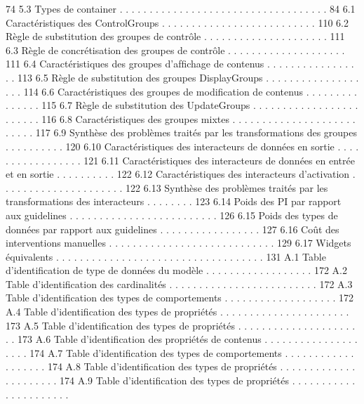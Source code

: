 \documentclass{article}
\begin{document}
74
5.3
Types de container
. . . . . . . . . . . . . . . . . . . . . . . . . . . . . . . . . . .
84
6.1
Caractéristiques des ControlGroups
. . . . . . . . . . . . . . . . . . . . . . . . . .
110
6.2
Règle de substitution des groupes de contrôle
. . . . . . . . . . . . . . . . . . . . .
111
6.3
Règle de concrétisation des groupes de contrôle . . . . . . . . . . . . . . . . . . . .
111
6.4
Caractéristiques des groupes d’afﬁchage de contenus
. . . . . . . . . . . . . . . . .
113
6.5
Règle de substitution des groupes DisplayGroups . . . . . . . . . . . . . . . . . . .
114
6.6
Caractéristiques des groupes de modiﬁcation de contenus . . . . . . . . . . . . . . .
115
6.7
Règle de substitution des UpdateGroups . . . . . . . . . . . . . . . . . . . . . . . .
116
6.8
Caractéristiques des groupes mixtes
. . . . . . . . . . . . . . . . . . . . . . . . . .
117
6.9
Synthèse des problèmes traités par les transformations des groupes . . . . . . . . . .
120
6.10 Caractéristiques des interacteurs de données en sortie . . . . . . . . . . . . . . . . .
121
6.11 Caractéristiques des interacteurs de données en entrée et en sortie
. . . . . . . . . .
122
6.12 Caractéristiques des interacteurs d’activation
. . . . . . . . . . . . . . . . . . . . .
122
6.13 Synthèse des problèmes traités par les transformations des interacteurs . . . . . . . .
123
6.14 Poids des PI par rapport aux guidelines . . . . . . . . . . . . . . . . . . . . . . . . .
126
6.15 Poids des types de données par rapport aux guidelines . . . . . . . . . . . . . . . . .
127
6.16 Coût des interventions manuelles . . . . . . . . . . . . . . . . . . . . . . . . . . . .
129
6.17 Widgets équivalents . . . . . . . . . . . . . . . . . . . . . . . . . . . . . . . . . . .
131
A.1
Table d’identiﬁcation de type de données du modèle . . . . . . . . . . . . . . . . . .
172
A.2
Table d’identiﬁcation des cardinalités
. . . . . . . . . . . . . . . . . . . . . . . . .
172
A.3
Table d’identiﬁcation des types de comportements . . . . . . . . . . . . . . . . . . .
172
A.4
Table d’identiﬁcation des types de propriétés . . . . . . . . . . . . . . . . . . . . . .
173
A.5
Table d’identiﬁcation des types de propriétés . . . . . . . . . . . . . . . . . . . . . .
173
A.6
Table d’identiﬁcation des propriétés de contenus . . . . . . . . . . . . . . . . . . . .
174
A.7
Table d’identiﬁcation des types de comportements . . . . . . . . . . . . . . . . . . .
174
A.8
Table d’identiﬁcation des types de propriétés . . . . . . . . . . . . . . . . . . . . . .
174
A.9
Table d’identiﬁcation des types de propriétés . . . . . . . . . . . . . . . . . . . . . .
\end{document}
